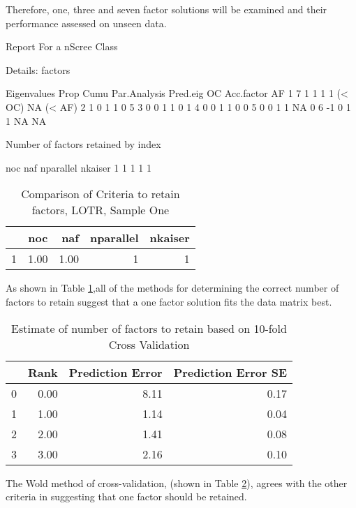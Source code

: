 \documentclass{article}
\begin{document}
Therefore, one, three and seven factor solutions will be examined and their performance assessed on unseen data. 




Report For a nScree Class 

Details: factors 

  Eigenvalues Prop Cumu Par.Analysis Pred.eig     OC Acc.factor     AF
1           7    1    1            1        1 (< OC)         NA (< AF)
2           1    0    1            1        0                 5       
3           0    0    1            1        0                 1       
4           0    0    1            1        0                 0       
5           0    0    1            1       NA                 0       
6          -1    0    1            1       NA                NA       


 Number of factors retained by index 

  noc naf nparallel nkaiser
1   1   1         1       1
\begin{table}[ht]
\centering
\begin{tabular}{rrrrr}
  \hline
 & noc & naf & nparallel & nkaiser \\ 
  \hline
1 & 1.00 & 1.00 &   1 &   1 \\ 
   \hline
\end{tabular}
\caption{Comparison of Criteria to retain factors, LOTR, Sample One} 
\label{tab:lotrretain}
\end{table}
As shown in Table \ref{tab:lotrretain},all of the methods for determining the correct number of factors to retain suggest that a one factor solution fits the data matrix best. 

\clearpage

\begin{table}[ht]
\centering
\begin{tabular}{rrrr}
  \hline
 & Rank & Prediction Error & Prediction Error SE \\ 
  \hline
0 & 0.00 & 8.11 & 0.17 \\ 
  1 & 1.00 & 1.14 & 0.04 \\ 
  2 & 2.00 & 1.41 & 0.08 \\ 
  3 & 3.00 & 2.16 & 0.10 \\ 
   \hline
\end{tabular}
\caption{Estimate of number of factors to retain based on 10-fold Cross Validation} 
\label{tab:lotrfactwold}
\end{table}
The Wold method of cross-validation, (shown in Table \ref{tab:lotrfactwold}), agrees with the other criteria in suggesting that one factor should be retained. 
\end{document}

